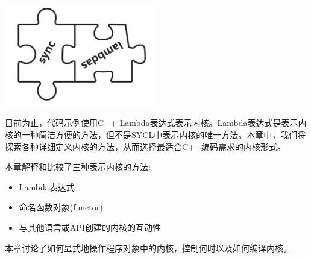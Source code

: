 \begin{center}
	\includegraphics[width=0.5\textwidth]{content/chapter-10/images/1}
\end{center}

目前为止，代码示例使用C++ Lambda表达式表示内核。Lambda表达式是表示内核的一种简洁方便的方法，但不是SYCL中表示内核的唯一方法。本章中，我们将探索各种详细定义内核的方法，从而选择最适合C++编码需求的内核形式。\par

本章解释和比较了三种表示内核的方法:\par

\begin{itemize}
	\item Lambda表达式
	\item 命名函数对象(functor)
	\item 与其他语言或API创建的内核的互动性
\end{itemize}

本章讨论了如何显式地操作程序对象中的内核，控制何时以及如何编译内核。\par




